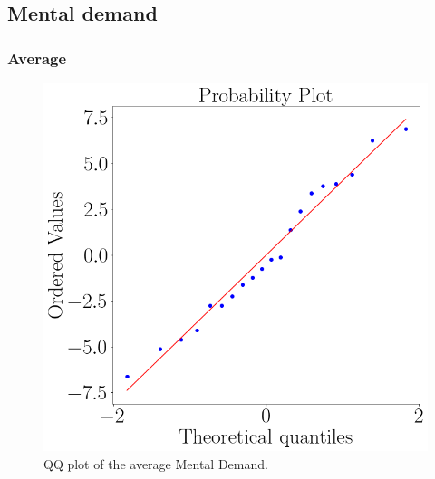 \subsection{Mental demand}

    \subsubsection{Average}
        \begin{figure}[!htb]
            \begin{minipage}{0.45\linewidth}
                \centering
                \includegraphics[width = \linewidth]{Resultados/Nasa/Figuras/png/qqplot_md_avg.png}
                \caption{QQ plot of the average Mental Demand.}
                \label{fig:qqplot_md_average}
            \end{minipage}
            \begin{minipage}{0.1\linewidth}
                \hfill
            \end{minipage}
            \begin{minipage}{0.45\linewidth}
                \centering

\end{minipage}
\end{figure}
